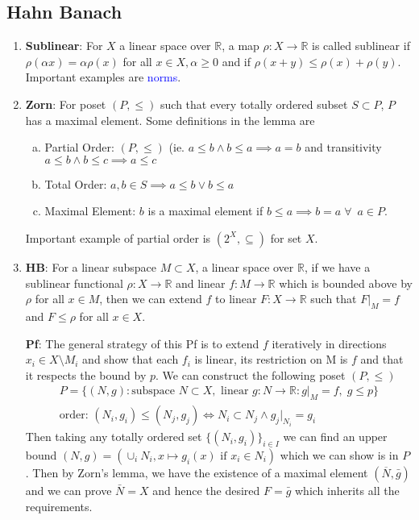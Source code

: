 \documentclass{article}
\begin{document}
\subsection*{Hahn Banach}
\begin{enumerate}
    \item \textbf{Sublinear}: For \(X\) a linear space over \(\mathbb{R}\), a map \(\rho : X \to \mathbb{R}\) is called sublinear if \(\rho(\alpha x) = \alpha \rho(x)\) for all \(x \in X, \alpha \geq 0\) and if \(\rho(x+ y) \leq \rho(x)+ \rho(y)\). Important examples are \textcolor{blue}{norms}.
    
    \item \textbf{Zorn}: For poset \((P, \leq)\) such that every totally ordered subset \(S \subset P\), \(P\) has a maximal element. Some definitions in the lemma are
    \begin{enumerate} [a.]
        \item Partial Order: \((P, \leq)\) (ie. \(a \leq b \wedge b \leq a \implies a = b\) and transitivity \(a\leq b \wedge b\leq c \implies a\leq c\)
        \item Total Order:  \(a, b \in S \implies a \leq b \vee b\leq a\)
        \item Maximal Element: \(b\) is a maximal element if \(b \leq a \implies b = a\; \forall \;\ a \in P\).
    \end{enumerate} 
    Important example of partial order is \((2^X, \subseteq)\) for set \(X\).

    \item \textbf{HB}: For a linear subspace \(M \subset X\), a linear space over \(\mathbb{R}\), if we have a sublinear functional \(\rho : X \to \mathbb{R}\) and linear \(f: M \to \mathbb{R}\) which is bounded above by \(\rho\) for all \(x \in M\), then we can extend \(f\) to linear \(F:X \to \mathbb{R}\) such that \(F|_M = f\) and \(F \leq \rho\) for all \(x \in X\).

    \textbf{Pf}: The general strategy of this Pf is to extend \(f\) iteratively in directions \(x_i \in X\setminus M_i \) and show that each \(f_i\) is linear, its restriction on M is \(f\) and that it respects the bound by \(p\). We can construct the following poset \((P, \leq)\)
    \begin{gather*}
    P = \{(N, g):\text{subspace }N\subset X, \text{ linear }g:N \to \mathbb{R}:g|_M = f, \; g\leq p\}  \\
    \text{order: }  (N_i, g_i) \leq (N_j, g_j) \iff N_i\subset N_j \wedge g_j|_{N_i} = g_i
    \end{gather*}
    Then taking any totally ordered set \(\{(N_i, g_i)\}_{i \in I}\) we can find an upper bound \((N, g) = (\cup_iN_i, x\mapsto g_i(x) \text{ if }x_i \in N_i)\) which we can show is in \(P\). Then by Zorn's lemma, we have the existence of a maximal element \((\overline{N}, \bar g)\) and we can prove \(\bar N = X\) and hence the desired \(F= \bar g\) which inherits all the requirements.


\end{enumerate}
\end{document}
